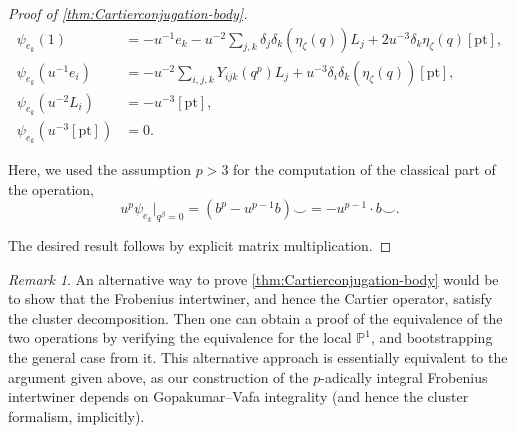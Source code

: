 \documentclass[reqno]{amsart}
\numberwithin{equation}{section}
\numberwithin{equation}{section}
\numberwithin{equation}{section}
\newtheorem{prop}[thm]{Proposition}
\theoremstyle{definition}
\theoremstyle{remark}
\theoremstyle{remark}
\newtheorem{rem}[thm]{Remark}
\begin{document}
\begin{proof}[Proof of \cref{thm:Cartierconjugation-body}]
\begin{align}\label{eqn:p-curv-formula}
\psi_{e_k} (1) &=  - u^{-1} e_k -  u^{-2} \sum_{j, k} \delta_j\delta_k(\eta_{\zeta}(q)) L_j +  2 u^{-3} \delta_k  \eta_{\zeta}(q) [\mathrm{pt}], \\
\psi_{e_k} (u^{-1}e_i) &=  - u^{-2}\sum_{i, j, k} Y_{ijk}(q^p) L_j   + u^{-3} \delta_i \delta_k (\eta_{\zeta}(q)) [\mathrm{pt}],\nonumber \\
\psi_{e_k} (u^{-2}L_i) &= -u^{-3} [\mathrm{pt}],  \nonumber \\
\psi_{e_k} (u^{-3} [\mathrm{pt}])&= 0 \nonumber  .
\end{align}

Here, we used the assumption $p > 3$ for the computation of the classical part of the operation,
\begin{equation}
    u^p \psi_{e_k}|_{q^\beta = 0} = (b^p - u^{p-1}b) \smile = -u^{p-1} \cdot b \smile.
\end{equation}

The desired result follows by explicit matrix multiplication.
\end{proof}

\begin{rem}
    An alternative way to prove \cref{thm:Cartierconjugation-body} would be to show that the Frobenius intertwiner, and hence the Cartier operator, satisfy the cluster decomposition. Then one can obtain a proof of the equivalence of the two operations by verifying the equivalence for the local $\mathbb{P}^1$, and bootstrapping the general case from it. This alternative approach is essentially equivalent to the argument given above, as our construction of the $p$-adically integral Frobenius intertwiner depends on Gopakumar--Vafa integrality (and hence the cluster formalism, implicitly).
\end{rem}



\appendix
\end{document}
